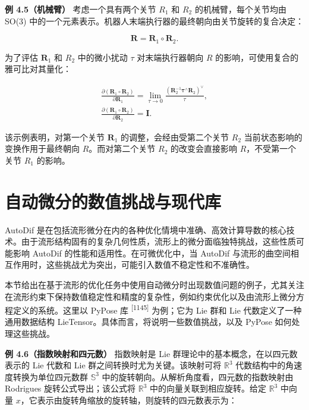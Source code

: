 \textbf{例 4.5（机械臂）} 考虑一个具有两个关节 $\scriptstyle { R _ { 1 } }$ 和 $R _ { 2 }$ 的机械臂，每个关节均由 SO(3) 中的一个元素表示。机器人末端执行器的最终朝向由关节旋转的复合决定：

\begin{equation}
\pmb {R} = \pmb {R} _ {1} \circ \pmb {R} _ {2}.\tag{4.38}
\end{equation}

为了评估 $\pmb { R } _ { 1 }$ 和 $R _ { 2 }$ 中的微小扰动 $\tau$ 对末端执行器朝向 $R$ 的影响，可使用复合的雅可比对其量化：

\begin{equation}
\begin{array}{l} \frac {\partial (\boldsymbol {R} _ {1} \circ \boldsymbol {R} _ {2})}{\partial \boldsymbol {R} _ {1}} = \lim _ {\tau \to 0} \frac {(\boldsymbol {R} _ {2} ^ {- 1} \boldsymbol {\tau} ^ {\wedge} \boldsymbol {R} _ {2}) ^ {\vee}}{\tau}, \\ \frac {\partial (\boldsymbol {R} _ {1} \circ \boldsymbol {R} _ {2})}{\partial \boldsymbol {R} _ {2}} = \boldsymbol {I}. \end{array}\tag{4.39}
\end{equation}

该示例表明，对第一个关节 $\pmb { R } _ { 1 }$ 的调整，会经由受第二个关节 $R _ { 2 }$ 当前状态影响的变换作用于最终朝向 $R$。而对第二个关节 $R _ { 2 }$ 的改变会直接影响 $R$，不受第一个关节 $R _ { 1 }$ 的影响。

\section{自动微分的数值挑战与现代库}

AutoDif 是在包括流形微分在内的各种优化情境中准确、高效计算导数的核心技术。由于流形结构固有的复杂几何性质，流形上的微分面临独特挑战，这些性质可能影响 AutoDif 的性能和适用性。在可微优化中，当 AutoDif 与流形的曲空间相互作用时，这些挑战尤为突出，可能引入数值不稳定性和不准确性。

本节给出在基于流形的优化任务中使用自动微分时出现数值问题的例子，尤其关注在流形约束下保持数值稳定性和精度的复杂性，例如约束优化以及由流形上微分方程定义的系统。这里以 PyPose 库 \textsuperscript{[1145]} 为例；它为 Lie 群和 Lie 代数定义了一种通用数据结构 LieTensor。具体而言，将说明一些数值挑战，以及 PyPose 如何处理这些挑战。

\textbf{例 4.6（指数映射和四元数）} 指数映射是 Lie 群理论中的基本概念，在以四元数表示的 Lie 代数和 Lie 群之间转换时尤为关键。该映射可将 $\mathbb { R } ^ { 3 }$ 代数结构中的角速度转换为单位四元数群 $\mathbb { S } ^ { 3 }$ 中的旋转朝向。从解析角度看，四元数的指数映射由 Rodrigues 旋转公式导出；该公式将 $\mathbb { R } ^ { 3 }$ 中的向量关联到相应旋转。给定 $\mathbb { R } ^ { 3 }$ 中向量 $x$，它表示由旋转角缩放的旋转轴，则旋转的四元数表示为：


